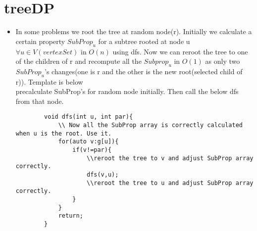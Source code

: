 \documentclass[../Notes.tex]{subfiles}
\begin{document}
\section{treeDP}
\begin{itemize}
	\item In some problems we root the tree at random node(r). Initially we calculate a certain property $SubProp_{u}$ for a subtree rooted at node u $\forall u \in V(vertexSet)$ in $O(n)$ using dfs. Now we can reroot the tree to one of the children of r and recompute all the $Subprop_u$ in $O(1)$ as only two $SubProp_u$'s changes(one is r and the other is the new root(selected child of r)). Template is below\\
precalculate SubProp's for random node initially. Then call the below dfs from that node.
	\begin{lstlisting}
		void dfs(int u, int par){
			\\ Now all the SubProp array is correctly calculated when u is the root. Use it.
			for(auto v:g[u]){
				if(v!=par){
					\\reroot the tree to v and adjust SubProp array correctly.
					dfs(v,u);
					\\reroot the tree to u and adjust SubProp array correctly.
				}
			}
			return;
		}
	\end{lstlisting}
\end{itemize}
\end{document}
